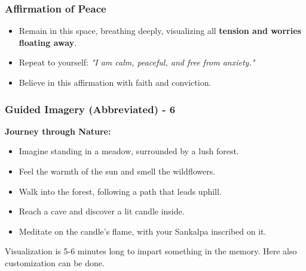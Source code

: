 \begin{frame}[fragile]\frametitle{Affirmation of Peace}
    \begin{itemize}
        \item Remain in this space, breathing deeply, visualizing all \textbf{tension and worries floating away}.
        \item Repeat to yourself: \textit{"I am calm, peaceful, and free from anxiety."}
        \item Believe in this affirmation with faith and conviction.
    \end{itemize}
\end{frame}


\begin{frame}[fragile]\frametitle{Guided Imagery (Abbreviated) - 6}
    \textbf{Journey through Nature:}
    \begin{itemize}
        \item Imagine standing in a meadow, surrounded by a lush forest.
        \item Feel the warmth of the sun and smell the wildflowers.
        \item Walk into the forest, following a path that leads uphill.
        \item Reach a cave and discover a lit candle inside.
        \item Meditate on the candle's flame, with your Sankalpa inscribed on it.
    \end{itemize}
	
Visualization is 5-6 minutes long to impart something in the memory. Here also customization can be done.
	
\end{frame}

